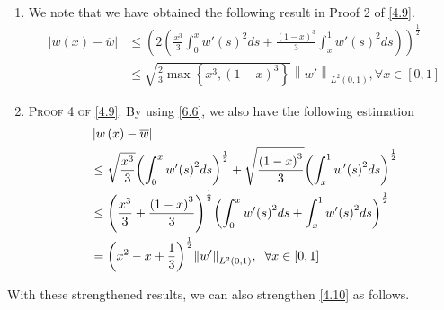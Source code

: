 \documentclass[a4paper]{article}
\numberwithin{equation}{section}
\begin{document}
\begin{enumerate}
\item We note that we have obtained the following result in Proof 2 of \eqref{4.9}.
\begin{align}
\left| {w\left( x \right) - \overline w } \right| &\le {\left( {2\left( {\frac{{{x^3}}}{3}\int_0^x {w'{{\left( s \right)}^2}ds}  + \frac{{{{\left( {1 - x} \right)}^3}}}{3}\int_x^1 {w'{{\left( s \right)}^2}ds} } \right)} \right)^{\frac{1}{2}}}\\
 &\le \sqrt {\frac{2}{3}\max \left\{ {{x^3},{{\left( {1 - x} \right)}^3}} \right\}} {\left\| {w'} \right\|_{{L^2}\left( {0,1} \right)}},\forall x \in \left[ {0,1} \right] \label{4.46}
\end{align}
\item \textsc{Proof 4 of \eqref{4.9}.} By using \eqref{6.6}, we also have the following estimation
\begin{align}
\label{4.47}
&\left| {w\left( x \right) - \overline w } \right| \\
&\le \sqrt {\frac{{{x^3}}}{3}} {\left( {\int_0^x {w'{{\left( s \right)}^2}ds} } \right)^{\frac{1}{2}}} + \sqrt {\frac{{{{\left( {1 - x} \right)}^3}}}{3}} {\left( {\int_x^1 {w'{{\left( s \right)}^2}ds} } \right)^{\frac{1}{2}}}\\
 &\le {\left( {\frac{{{x^3}}}{3} + \frac{{{{\left( {1 - x} \right)}^3}}}{3}} \right)^{\frac{1}{2}}}{\left( {\int_0^x {w'{{\left( s \right)}^2}ds}  + \int_x^1 {w'{{\left( s \right)}^2}ds} } \right)^{\frac{1}{2}}}\\
 &= {\left( {{x^2} - x + \frac{1}{3}} \right)^{\frac{1}{2}}}{\left\| {w'} \right\|_{{L^2}\left( {0,1} \right)}},\hspace{0.2cm}\forall x \in \left[ {0,1} \right] \label{4.50}
\end{align}
\end{enumerate}
With these strengthened results, we can also strengthen \eqref{4.10} as follows.
\end{document}
